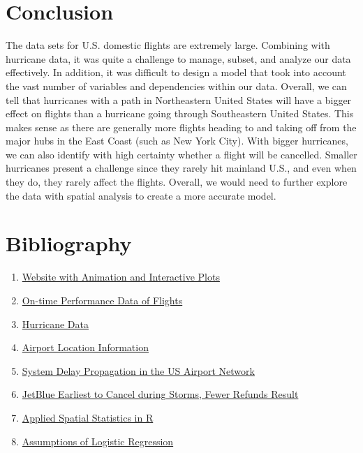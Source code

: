 \documentclass[12pt]{article}
\begin{document}
\section{Conclusion} \label{sec:Conclusion}
The data sets for U.S. domestic flights are extremely large. Combining with hurricane data, it was quite a challenge to manage, subset, and analyze our data effectively. In addition, it was difficult to design a model that took into account the vast number of variables and dependencies within our data. Overall, we can tell that hurricanes with a path in Northeastern United States will have a bigger effect on flights than a hurricane going through Southeastern United States. This makes sense as there are generally more flights heading to and taking off from the major hubs in the East Coast (such as New York City). With bigger hurricanes, we can also identify with high certainty whether a flight will be cancelled. Smaller hurricanes present a challenge since they rarely hit mainland U.S., and even when they do, they rarely affect the flights. Overall, we would need to further explore the data with spatial analysis to create a more accurate model.

\section{Bibliography} \label{sec:Bibliography}
\begin{enumerate}
\item \href{http://point.fungservices.com/flightanalysis}{Website with Animation and Interactive Plots}
\item 
\href{https://www.transtats.bts.gov/DL_SelectFields.asp?Table_ID=236&DB_Short_Name=On-Time}{On-time Performance Data of Flights}
\item \href{https://www.ncdc.noaa.gov/ibtracs/index.php?name=wmo-data}{Hurricane Data}
\item 
\href{https://raw.githubusercontent.com/jpatokal/openflights/master/data/airports.dat}{Airport Location Information}
\item \href{https://www.nature.com/articles/srep01159}{System Delay Propagation in the US Airport Network}
\item
\href{http://www.reuters.com/article/us-jetblue-airways-cancellation-analysis-idUSKBN0N50BF20150414}{ JetBlue Earliest to Cancel during Storms, Fewer Refunds Result}
\item 
\href{http://www.people.fas.harvard.edu/~zhukov/spatial.html}{Applied Spatial Statistics in R}
\item \href{http://www.statisticssolutions.com/assumptions-of-logistic-regression/}{Assumptions of Logistic Regression}
\end{enumerate}
\end{document}
